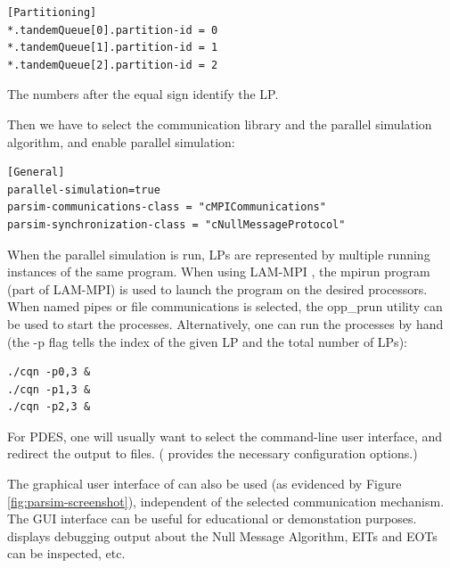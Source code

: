 \begin{verbatim}
[Partitioning]
*.tandemQueue[0].partition-id = 0
*.tandemQueue[1].partition-id = 1
*.tandemQueue[2].partition-id = 2
\end{verbatim}

The numbers after the equal sign identify the LP.

Then we have to select the communication library and the parallel
simulation algorithm, and enable parallel simulation:

\begin{verbatim}
[General]
parallel-simulation=true
parsim-communications-class = "cMPICommunications"
parsim-synchronization-class = "cNullMessageProtocol"
\end{verbatim}

When the parallel simulation is run, LPs are represented
by multiple running instances of the same program.
When using LAM-MPI \cite{lammpi}, the mpirun program (part of LAM-MPI)
is used to launch the program on the desired processors.
When named pipes or file communications is selected, the opp\_prun
{\opp} utility can be used to start the processes.
Alternatively, one can run the processes by hand (the -p flag
tells {\opp} the index of the given LP and the total number of LPs):

\begin{verbatim}
./cqn -p0,3 &
./cqn -p1,3 &
./cqn -p2,3 &
\end{verbatim}

For PDES, one will usually want to select the command-line user interface,
and redirect the output to files. ({\opp} provides the necessary
configuration options.)

The graphical user interface of {\opp} can also be used
(as evidenced by Figure \ref{fig:parsim-screenshot}),
independent of the selected communication mechanism.
The GUI interface can be useful for educational or demonstation purposes.
{\opp} displays debugging output about the Null Message Algorithm,
EITs and EOTs can be inspected, etc.





